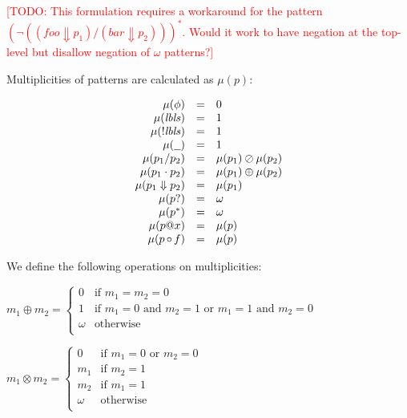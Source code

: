 \documentclass{article}
\makeatletter
\newcommand{\RED}[1]{\textcolor{red}{#1}}
\newcommand{\TODO}[1]{\RED{[TODO: #1]}}
\newcommand{\lbls}{\ensuremath{\mathit{lbls}}}
\newcommand{\pseq}[2]{\ensuremath{#1 \cdot #2}}
\newcommand{\por}[2]{\ensuremath{#1/#2}}
\newcommand{\children}[2]{\ensuremath{#1} \Downarrow #2}
\newcommand{\pnot}[1]{\ensuremath{\lnot #1}}
\newcommand{\maybe}[1]{\ensuremath{#1?}}
\newcommand{\many}[1]{\ensuremath{#1^*}}
\newcommand{\any}{\ensuremath{\text{\underline{\hspace{0.6em}}}}}
\newcommand{\bind}[2]{\ensuremath{#1@#2}}
\newcommand{\paction}[2]{\ensuremath{#1\mathop{\circ} #2}}
\makeatother
\begin{document}
\TODO{This formulation requires a workaround for the pattern
  $\many{(\pnot{(\por{(\children{\mathit{foo}}{p_1})}{(\children{\mathit{bar}}{p_2})})})}$.
  Would it work to have negation at the top-level but disallow
  negation of $\omega$ patterns?}

Multiplicities of patterns are calculated as $\mu(p)$:

\[
  \begin{array}{rcl}
    \mu(\phi)                & = & 0                         \\
    \mu(\lbls)               & = & 1                         \\
    \mu(!\lbls)              & = & 1                         \\
    \mu(\any)                & = & 1                         \\
    \mu(\por{p_1}{p_2})      & = & \mu(p_1) \oslash \mu(p_2) \\
    \mu(\pseq{p_1}{p_2})     & = & \mu(p_1) \oplus \mu(p_2)  \\
    \mu(\children{p_1}{p_2}) & = & \mu(p_1)                  \\
    \mu(\maybe{p})           & = & \omega                    \\
    \mu(\many{p})            & = & \omega                    \\
    \mu(\bind{p}{x})         & = & \mu(p)                    \\
    \mu(\paction{p}{f})      & = & \mu(p)                    \\
  \end{array}
\]

We define the following operations on multiplicities:

$
  m_1 \oplus m_2 =
  \begin{cases}
    0 & \text{if $m_1 = m_2 = 0$}\\
    1 & \text{if $m_1 = 0$ and $m_2 = 1$ or $m_1 = 1$ and $m_2 = 0$}\\
    \omega & \text{otherwise}\\
  \end{cases}
$

$
  m_1 \otimes m_2 =
  \begin{cases}
    0 & \text{if $m_1 = 0$ or $m_2 = 0$}\\
    m_1 & \text{if $m_2 = 1$}\\
    m_2 & \text{if $m_1 = 1$}\\
    \omega & \text{otherwise}\\
  \end{cases}
$
\end{document}
